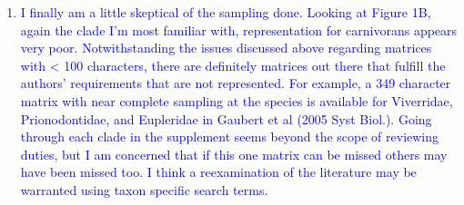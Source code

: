 \documentclass[12pt,letterpaper]{article}
\begin{document}
\begin{enumerate}
\item{\textcolor{blue}{I finally am a little skeptical of the sampling done. Looking at Figure 1B, again the clade I'm most familiar with, representation for carnivorans appears very poor. Notwithstanding the issues discussed above regarding matrices with < 100 characters, there are definitely matrices out there that fulfill the authors' requirements that are not represented. For example, a 349 character matrix with near complete sampling at the species is available for Viverridae, Prionodontidae, and Eupleridae in Gaubert et al (2005 Syst Biol.). Going through each clade in the supplement seems beyond the scope of reviewing duties, but I am concerned that if this one matrix can be missed others may have been missed too. I think a reexamination of the literature may be warranted using taxon specific search terms.}}




\end{enumerate}
\end{document}
